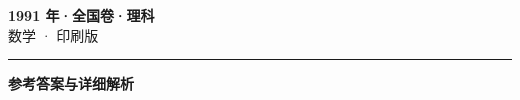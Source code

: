 \documentclass[zihao=5, a4paper]{ctexart}
\begin{document}
\begin{center}
  {\Large\bfseries 1991 年·全国卷·理科}\\[4pt]
  {\large 数学 · 印刷版}
\end{center}
\medskip
{}

\par\bigskip\hrule\bigskip
{}
\begin{center}{\large\bfseries 参考答案与详细解析}\end{center}
\smallskip

\end{document}
